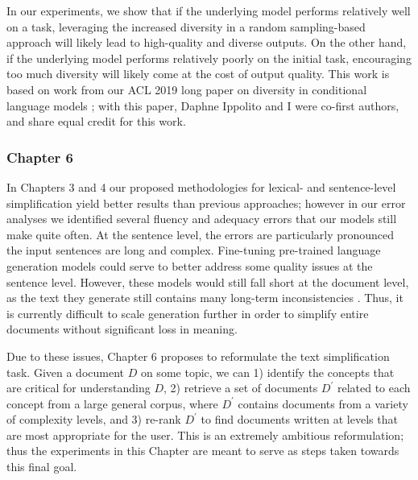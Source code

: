 \documentclass[thesis.tex]{subfiles}
\begin{document}
In our experiments, we show that if the underlying model performs relatively well on a task, leveraging the increased diversity in a random sampling-based approach will likely lead to high-quality and diverse outputs. On the other hand, if the underlying model performs relatively poorly on the initial task, encouraging too much diversity will likely come at the cost of output quality. This work is based on work from our ACL 2019 long paper on diversity in conditional language models \citep{ippolito2019comparison}; with this paper, Daphne Ippolito and I were co-first authors, and share equal credit for this work.

\subsubsection{Chapter 6}


In Chapters 3 and 4 our proposed methodologies for lexical- and sentence-level simplification yield better results than previous approaches; however in our error analyses we identified several fluency and adequacy errors that our models still make quite often. At the sentence level, the errors are particularly pronounced the input sentences are long and complex. %
Fine-tuning pre-trained language generation models \citep{radford2019language,brown2020language} could serve to better address some quality issues at the sentence level. However, these models would still fall short at the document level, as the text they generate still contains many long-term inconsistencies \citep{ippolito2020automatic}. Thus, it is currently difficult to scale generation further in order to simplify entire documents without significant loss in meaning.

Due to these issues, Chapter 6 proposes to reformulate the text simplification task.  Given a document $D$ on some topic, we can 1) identify the concepts that are critical for understanding $D$, 2) retrieve a set of documents $D^{\prime}$ related to each concept from a large general corpus, where $D^{\prime}$ contains documents from a variety of complexity levels, and 3) re-rank $D^{\prime}$ to find documents written at levels that are most appropriate for the user. This is an extremely ambitious reformulation; thus the experiments in this Chapter are meant to serve as steps taken towards this final goal.
\end{document}
